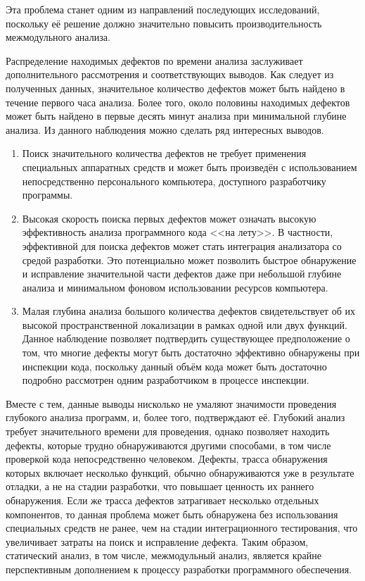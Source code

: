 Эта проблема станет одним из направлений последующих исследований, поскольку её решение должно значительно повысить производительность межмодульного анализа.

Распределение находимых дефектов по времени анализа заслуживает дополнительного рассмотрения и соответствующих выводов. Как следует из полученных данных, значительное количество дефектов может быть найдено в течение первого часа анализа. Более того, около половины находимых дефектов может быть найдено в первые десять минут анализа при минимальной глубине анализа. Из данного наблюдения можно сделать ряд интересных выводов.

\begin{enumerate}
 \item Поиск значительного количества дефектов не требует применения специальных аппаратных средств и может быть произведён с использованием непосредственно персонального компьютера, доступного разработчику программы.
 \item Высокая скорость поиска первых дефектов может означать высокую эффективность анализа программного кода <<на лету>>. В частности, эффективной для поиска дефектов может стать интеграция анализатора со средой разработки. Это потенциально может позволить быстрое обнаружение и исправление значительной части дефектов даже при небольшой глубине анализа и минимальном фоновом использовании ресурсов компьютера.
 \item Малая глубина анализа большого количества дефектов свидетельствует об их высокой пространственной локализации в рамках одной или двух функций. Данное наблюдение позволяет подтвердить существующее предположение о том, что многие дефекты могут быть достаточно эффективно обнаружены при инспекции кода, поскольку данный объём кода может быть достаточно подробно рассмотрен одним разработчиком в процессе инспекции.
\end{enumerate}

Вместе с тем, данные выводы нисколько не умаляют значимости проведения глубокого анализа программ, и, более того, подтверждают её. Глубокий анализ требует значительного времени для проведения, однако позволяет находить дефекты, которые трудно обнаруживаются другими способами, в том числе проверкой кода непосредственно человеком. Дефекты, трасса обнаружения которых включает несколько функций, обычно обнаруживаются уже в результате отладки, а не на стадии разработки, что повышает ценность их раннего обнаружения. Если же трасса дефектов затрагивает несколько отдельных компонентов, то данная проблема может быть обнаружена без использования специальных средств не ранее, чем на стадии интеграционного тестирования, что увеличивает затраты на поиск и исправление дефекта. Таким образом, статический анализ, в том числе, межмодульный анализ, является крайне перспективным дополнением к процессу разработки программного обеспечения.
